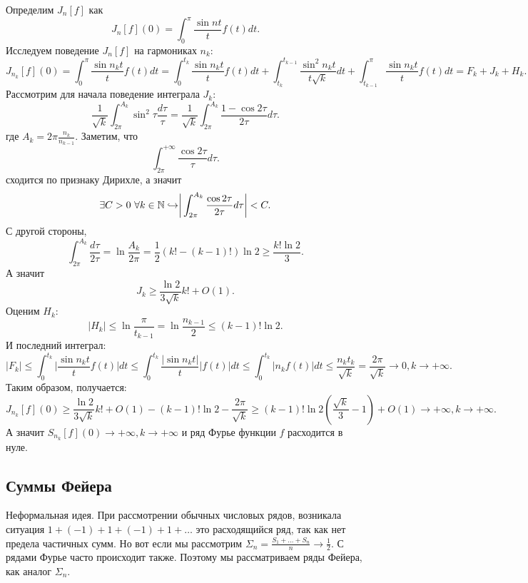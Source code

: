 \begin{example}[Шварц]
    Определим $J_n[f]$ как \[
                                                                                                  J_n[f](0) = \int_0^\pi \dfrac{\sin nt}{t}f(t)dt.
    \]
    Исследуем поведение $J_n[f]$ на гармониках $n_k$:
    \[
        J_{n_k}[f](0) = \int_0^\pi \dfrac{\sin n_kt}{t}f(t)dt = \int_0^{t_k}\dfrac{\sin n_kt }{t}f(t)dt + \int_{t_k}^{t_{k - 1}}\dfrac{\sin^2 n_kt}{t \sqrt{k}}dt + \int_{t_{k - 1}}^\pi \dfrac{\sin n_kt}{t}f(t)dt = F_k + J_k + H_k.
    \]
    Рассмотрим для начала поведение интеграла $J_k$:
    \[
        \dfrac{1}{\sqrt{k}}\int_{2\pi}^{A_k}\sin^2 \tau \dfrac{d\tau}{\tau} = \dfrac{1}{\sqrt{k}}\int_{2\pi}^{A_k}\dfrac{1 - \cos 2\tau}{2\tau}d\tau.
    \]
    где $A_k = 2\pi \frac{n_k}{n_{k - 1}}$. Заметим, что \[
                                                             \int_{2\pi}^{+\infty}\dfrac{\cos 2\tau}{\tau}d\tau.
    \]
    сходится по признаку Дирихле, а значит \[
                                               \exists C > 0 \ \forall k \in \mathbb{N} \hookrightarrow \biggr|\int_{2\pi}^{A_k} \dfrac{\cos 2\tau}{2\tau}d\tau\biggr| < C.
    \]
    С другой стороны, \[
                          \int_{2\pi}^{A_k} \dfrac{d\tau}{2\tau} = \ln \dfrac{A_k}{2\pi} = \dfrac{1}{2}(k! - (k - 1)!)\ln 2 \geq \dfrac{k! \ln 2}{3}.
    \]
    А значит \[
                 J_k \geq \dfrac{\ln 2}{3\sqrt{k}}k! + O(1).
    \]
    Оценим $H_k$: \[
                      |H_k| \leq \ln \dfrac{\pi}{t_{k - 1}} = \ln \dfrac{n_{k - 1}}{2} \leq (k - 1)!\ln 2.
    \]
    И последний интеграл: \[
                              |F_k| \leq \int_0^{t_k} \biggr|\dfrac{\sin n_kt}{t}f(t)\biggr|dt \leq \int_0^{t_{k}}\dfrac{|\sin n_kt|}{t}|f(t)|dt \leq \int_0^{t_k}|n_kf(t)|dt \leq \dfrac{n_k t_k}{\sqrt{k}} = \dfrac{2\pi}{\sqrt{k}} \rightarrow 0, k \rightarrow +\infty.
    \]
    Таким образом, получается: \[
                                   J_{n_k}[f](0) \geq \dfrac{\ln 2}{3\sqrt{k}}k! + O(1) - (k - 1)!\ln 2 - \dfrac{2\pi }{\sqrt{k}} \geq (k - 1)!\ln 2(\dfrac{\sqrt{k}}{3} - 1) + O(1) \rightarrow +\infty, k \rightarrow +\infty.
    \]
    А значит $S_{n_k}[f](0) \rightarrow +\infty, k \rightarrow +\infty$ и ряд Фурье функции $f$ расходится в нуле.
\end{example}
\subsection{Суммы Фейера}
Неформальная идея. При рассмотрении обычных числовых рядов, возникала ситуация $1 + (-1) + 1 + (-1) + 1  + \dots$ это расходящийся ряд, так как нет предела частичных сумм. Но вот если мы рассмотрим $\Sigma_n = \frac{S_1 +\dots +S_n}{n} \to \frac{1}{2}$. С рядами Фурье часто происходит также. Поэтому мы рассматриваем ряды Фейера, как аналог $\Sigma_n$.


